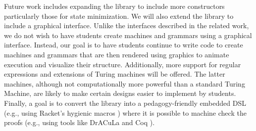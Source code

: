 \documentclass{eptcs}
\begin{document}
Future work includes expanding the library to include more constructors particularly those for state minimization. We will also extend the library to include a graphical interface. Unlike the interfaces described in the related work, we do not wish to have students create machines and grammars using a graphical interface. Instead, our goal is to have students continue to write code to create machines and grammars that are then rendered using graphics to animate execution and visualize their structure. Additionally, more support for regular expressions and extensions of Turing machines will be offered. The latter machines, although not computationally more powerful than a standard Turing Machine, are likely to make certain designs easier to implement by students. Finally, a goal is to convert the library into a pedagogy-friendly embedded DSL (e.g., using Racket's hygienic macros \cite{AutomataMacros}) where it is possible to machine check the proofs (e.g., using tools like DrACuLa \cite{Eastlund} and Coq \cite{Coq}).




\end{document}
